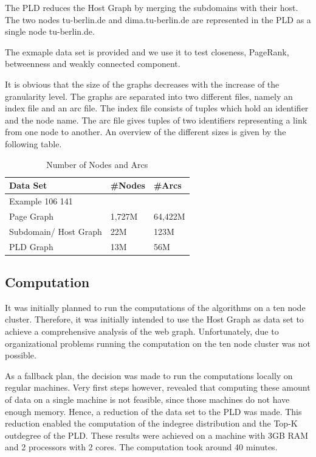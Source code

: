 The PLD reduces the Host Graph by merging the subdomains with their host. The two nodes tu-berlin.de and dima.tu-berlin.de are represented in the PLD as a single node tu-berlin.de.

The exmaple data set is provided and we use it to test closeness, PageRank, betweenness and weakly connected component.

It is obvious that the size of the graphs decreases with the increase of the granularity level. The graphs are separated into two different files, namely an index file and an arc file. The index file consists of tuples which hold an identifier and the node name. The arc file gives tuples of two identifiers representing a link from one node to another. An overview of the different sizes is given by the following table.

\begin{table}[H]
	\caption{Number of Nodes and Arcs}
	\label{t2}
	\begin{center}
		\begin{tabular}{|l|l|l|}
			\hline
			Data Set	&\#Nodes	&\#Arcs \\ \hline
			Example	        106		141	\\ \hline
			Page Graph	&1,727M	&64,422M	\\	\hline
			Subdomain/ Host Graph	&22M	&123M	\\	\hline		
			PLD Graph	&13M	&56M	\\	\hline				
		\end{tabular}
	\end{center}
\end{table}

\subsection{Computation}
It was initially planned to run the computations of the algorithms on a ten node cluster. Therefore, it was initially intended to use the Host Graph as data set to achieve a comprehensive  analysis of the web graph. Unfortunately, due to organizational problems running the computation on the ten node cluster was not possible.

As a fallback plan, the decision was made to run the computations locally on regular machines. Very first steps however, revealed that computing these amount of data on a single machine is not feasible, since those machines do not have enough memory. Hence, a reduction of the data set to the PLD was made. This reduction enabled the computation of the indegree distribution and the Top-K outdegree of the PLD. These results were achieved on a machine with 3GB RAM and 2 processors with 2 cores. The computation took around 40 minutes. 

